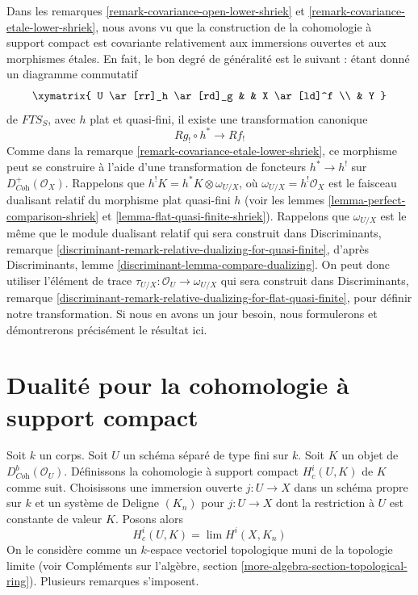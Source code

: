 \begin{remark}
\label{remark-covariance-lower-shriek}
Dans les remarques \ref{remark-covariance-open-lower-shriek} et \ref{remark-covariance-etale-lower-shriek}, nous avons vu que la construction de la cohomologie à support compact est covariante relativement aux immersions ouvertes et aux morphismes \'etales. En fait, le bon degré de généralité est le suivant : étant donné un diagramme commutatif
$$
\xymatrix{
U \ar[rr]_h \ar[rd]_g & & X \ar[ld]^f \\
& Y
}
$$
de $\textit{FTS}_S$, avec $h$ plat et quasi-fini, il existe une transformation canonique
$$
Rg_! \circ h^* \longrightarrow Rf_!
$$
Comme dans la remarque \ref{remark-covariance-etale-lower-shriek}, ce morphisme peut se construire à l'aide d'une transformation de foncteurs $h^* \to h^!$ sur $D^+_{\textit{Coh}}(\mathcal{O}_X)$. Rappelons que $h^!K = h^*K \otimes \omega_{U/X}$, où $\omega_{U/X} = h^!\mathcal{O}_X$ est le faisceau dualisant relatif du morphisme plat quasi-fini $h$ (voir les lemmes \ref{lemma-perfect-comparison-shriek} et \ref{lemma-flat-quasi-finite-shriek}). Rappelons que $\omega_{U/X}$ est le même que le module dualisant relatif qui sera construit dans Discriminants, remarque \ref{discriminant-remark-relative-dualizing-for-quasi-finite}, d'après Discriminants, lemme \ref{discriminant-lemma-compare-dualizing}. On peut donc utiliser l'élément de trace
$\tau_{U/X} : \mathcal{O}_U \to \omega_{U/X}$
qui sera construit dans Discriminants, remarque \ref{discriminant-remark-relative-dualizing-for-flat-quasi-finite}, pour définir notre transformation. Si nous en avons un jour besoin, nous formulerons et démontrerons précisément le résultat ici.
\end{remark}







\section{Dualité pour la cohomologie à support compact}
\label{section-duality-compactly-supported}

\noindent
Soit $k$ un corps. Soit $U$ un schéma séparé de type fini sur $k$. Soit $K$ un objet de $D^b_{\textit{Coh}}(\mathcal{O}_U)$. Définissons la cohomologie à support compact $H^i_c(U, K)$ de $K$ comme suit. Choisissons une immersion ouverte $j : U \to X$ dans un schéma propre sur $k$ et un système de Deligne $(K_n)$ pour $j : U \to X$ dont la restriction à $U$ est constante de valeur $K$. Posons alors
$$
H^i_c(U, K) = \lim H^i(X, K_n)
$$
On le considère comme un $k$-espace vectoriel topologique muni de la topologie limite (voir Compléments sur l'algèbre, section \ref{more-algebra-section-topological-ring}). Plusieurs remarques s'imposent.

